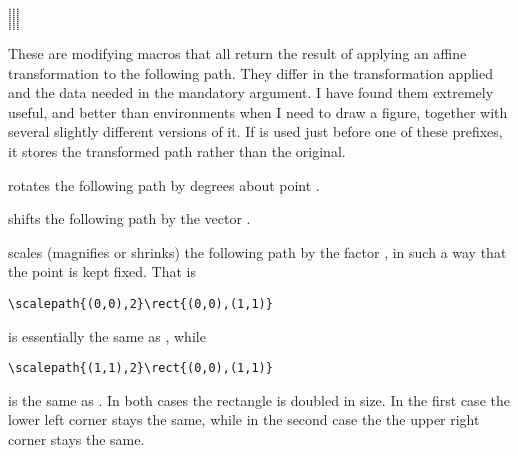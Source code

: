 \documentclass[letterpaper]{article}
\begin{document}
\begin{cd}
$\ldots$\\
$\ldots$\\
$\ldots$\\
$\ldots$\\
$\ldots$\\
$\ldots$\\
$\ldots$\\
$\ldots$\\
$\ldots$\\
$\ldots$\\
$\ldots$%
%
%
%
%
%
%
%
%
%
%
\end{cd}

These are modifying macros that all return the result of applying an
affine transformation to the following path. They differ in the
transformation applied and the data needed in the mandatory argument. I
have found them extremely useful, and better than 
environments when I need to draw a figure, together with several
slightly different versions of it. If  is used just before one
of these prefixes, it stores the transformed path rather than the
original.

 rotates the following path by \meta{$\theta$} degrees
about point .

 shifts the following path by the vector .

 scales (magnifies or shrinks) the following path by the
factor , in such a way that the point  is kept fixed.
That is
\begin{verbatim}
\scalepath{(0,0),2}\rect{(0,0),(1,1)}
\end{verbatim}
is essentially the same as , while
\begin{verbatim}
\scalepath{(1,1),2}\rect{(0,0),(1,1)}
\end{verbatim}
is the same as . In both cases the
rectangle is doubled in size. In the first case the lower left corner
stays the same, while in the second case the the upper right corner
stays the same.
\end{document}
